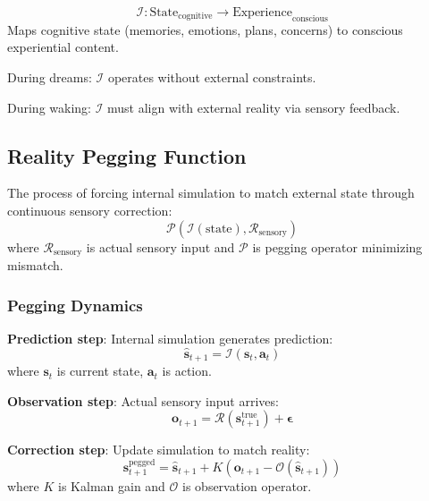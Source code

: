 \documentclass[11pt,onecolumn]{article}
\begin{document}
\begin{definition}
\begin{equation}
\mathcal{I}: \text{State}_{\text{cognitive}} \to \text{Experience}_{\text{conscious}}
\end{equation}
Maps cognitive state (memories, emotions, plans, concerns) to conscious experiential content.
\end{definition}

During dreams: $\mathcal{I}$ operates without external constraints.

During waking: $\mathcal{I}$ must align with external reality via sensory feedback.

\subsection{Reality Pegging Function}

\begin{definition}
The process of forcing internal simulation to match external state through continuous sensory correction:
\begin{equation}
\mathcal{P}(\mathcal{I}(\text{state}), \mathcal{R}_{\text{sensory}})
\end{equation}
where $\mathcal{R}_{\text{sensory}}$ is actual sensory input and $\mathcal{P}$ is pegging operator minimizing mismatch.
\end{definition}

\subsubsection{Pegging Dynamics}

\textbf{Prediction step}: Internal simulation generates prediction:
\begin{equation}
\hat{\mathbf{s}}_{t+1} = \mathcal{I}(\mathbf{s}_t, \mathbf{a}_t)
\end{equation}
where $\mathbf{s}_t$ is current state, $\mathbf{a}_t$ is action.

\textbf{Observation step}: Actual sensory input arrives:
\begin{equation}
\mathbf{o}_{t+1} = \mathcal{R}(\mathbf{s}_{t+1}^{\text{true}}) + \boldsymbol{\epsilon}
\end{equation}

\textbf{Correction step}: Update simulation to match reality:
\begin{equation}
\mathbf{s}_{t+1}^{\text{pegged}} = \hat{\mathbf{s}}_{t+1} + K(\mathbf{o}_{t+1} - \mathcal{O}(\hat{\mathbf{s}}_{t+1}))
\end{equation}
where $K$ is Kalman gain and $\mathcal{O}$ is observation operator.
\end{document}
